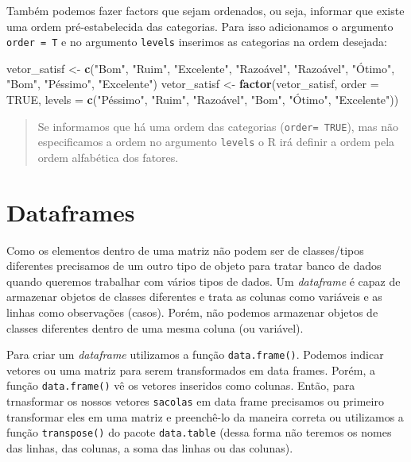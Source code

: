 \documentclass[]{book}
\newenvironment{Shaded}{\begin{snugshade}}{\end{snugshade}}
\newcommand{\DataTypeTok}[1]{\textcolor[rgb]{0.13,0.29,0.53}{#1}}
\newcommand{\KeywordTok}[1]{\textcolor[rgb]{0.13,0.29,0.53}{\textbf{#1}}}
\newcommand{\NormalTok}[1]{#1}
\newcommand{\OtherTok}[1]{\textcolor[rgb]{0.56,0.35,0.01}{#1}}
\newcommand{\StringTok}[1]{\textcolor[rgb]{0.31,0.60,0.02}{#1}}
\theoremstyle{definition}
\theoremstyle{definition}
\theoremstyle{definition}
\theoremstyle{remark}
\begin{document}
Também podemos fazer factors que sejam ordenados, ou seja, informar que existe uma ordem pré-estabelecida das categorias. Para isso adicionamos o argumento \texttt{order\ =\ T} e no argumento \texttt{levels} inserimos as categorias na ordem desejada:

\begin{Shaded}
\begin{Highlighting}[]
\NormalTok{vetor_satisf <-}\StringTok{ }\KeywordTok{c}\NormalTok{(}\StringTok{"Bom"}\NormalTok{, }\StringTok{"Ruim"}\NormalTok{, }\StringTok{"Excelente"}\NormalTok{, }\StringTok{"Razoável"}\NormalTok{, }\StringTok{"Razoável"}\NormalTok{, }\StringTok{"Ótimo"}\NormalTok{, }\StringTok{"Bom"}\NormalTok{, }\StringTok{"Péssimo"}\NormalTok{, }\StringTok{"Excelente"}\NormalTok{)}
\NormalTok{vetor_satisf <-}\StringTok{ }\KeywordTok{factor}\NormalTok{(vetor_satisf, }\DataTypeTok{order =} \OtherTok{TRUE}\NormalTok{, }\DataTypeTok{levels =} \KeywordTok{c}\NormalTok{(}\StringTok{"Péssimo"}\NormalTok{, }\StringTok{"Ruim"}\NormalTok{, }\StringTok{"Razoável"}\NormalTok{, }\StringTok{"Bom"}\NormalTok{, }\StringTok{"Ótimo"}\NormalTok{, }\StringTok{"Excelente"}\NormalTok{))}
\end{Highlighting}
\end{Shaded}

\begin{quote}
Se informamos que há uma ordem das categorias (\texttt{order=\ TRUE}), mas não especificamos a ordem no argumento \texttt{levels} o R irá definir a ordem pela ordem alfabética dos fatores.
\end{quote}

\hypertarget{dataframes}{%
\section{Dataframes}\label{dataframes}}

Como os elementos dentro de uma matriz não podem ser de classes/tipos diferentes precisamos de um outro tipo de objeto para tratar banco de dados quando queremos trabalhar com vários tipos de dados. Um \emph{dataframe} é capaz de armazenar objetos de classes diferentes e trata as colunas como variáveis e as linhas como observações (casos). Porém, não podemos armazenar objetos de classes diferentes dentro de uma mesma coluna (ou variável).

Para criar um \emph{dataframe} utilizamos a função \texttt{data.frame()}. Podemos indicar vetores ou uma matriz para serem transformados em data frames. Porém, a função \texttt{data.frame()} vê os vetores inseridos como colunas. Então, para trnasformar os nossos vetores \texttt{sacolas} em data frame precisamos ou primeiro transformar eles em uma matriz e preenchê-lo da maneira correta ou utilizamos a função \texttt{transpose()} do pacote \texttt{data.table} (dessa forma não teremos os nomes das linhas, das colunas, a soma das linhas ou das colunas).
\end{document}
